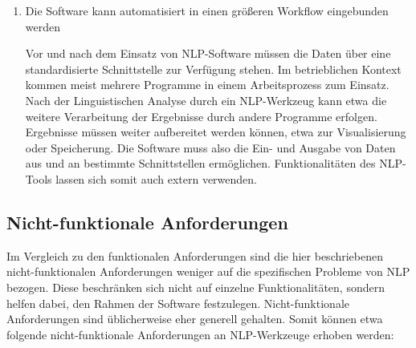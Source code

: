 \documentclass[12pt]{report}
\begin{document}
\begin{enumerate}
\item Die Software kann automatisiert in einen größeren Workflow eingebunden werden

Vor und nach dem Einsatz von NLP-Software müssen die Daten über eine standardisierte Schnittstelle zur Verfügung stehen. Im betrieblichen Kontext kommen meist mehrere Programme in einem Arbeitsprozess zum Einsatz. Nach der Linguistischen Analyse durch ein NLP-Werkzeug kann etwa die weitere Verarbeitung der Ergebnisse durch andere Programme erfolgen. Ergebnisse müssen weiter aufbereitet werden können, etwa zur Visualisierung oder Speicherung. Die Software muss also die Ein- und Ausgabe von Daten aus und an bestimmte Schnittstellen ermöglichen. Funktionalitäten des NLP-Tools lassen sich somit auch extern verwenden. 
\end{enumerate}

\subsection{Nicht-funktionale Anforderungen}
Im Vergleich zu den funktionalen Anforderungen sind die hier beschriebenen nicht-funktionalen Anforderungen weniger auf die spezifischen Probleme von NLP bezogen. Diese beschränken sich nicht auf einzelne Funktionalitäten, sondern helfen dabei, den Rahmen der Software festzulegen. Nicht-funktionale Anforderungen sind üblicherweise eher generell gehalten. Somit können etwa folgende nicht-funktionale Anforderungen an NLP-Werkzeuge erhoben werden:
\end{document}
